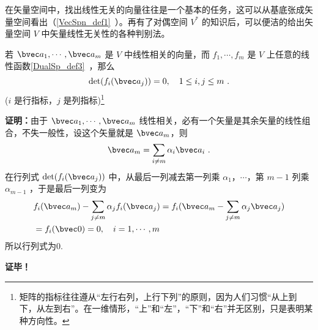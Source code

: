 
\begin{issues}
\end{issues}

在矢量空间中，找出线性无关的向量往往是一个基本的任务，这可以从基底张成矢量空间看出（\autoref{VecSpn_def1}~）。再有了对偶空间 $V^*$ 的知识后，可以便洁的给出矢量空间 $V$ 中矢量线性无关性的各种判别法。
\begin{lemma}{}\label{LinInD_lem1}
若 $\bvec a_1,\cdots,\bvec a_m$ 是 $V$ 中线性相关的向量，而 $f_1,\cdots,f_m$ 是 $V$ 上任意的线性函数\autoref{DualSp_def3}~，那么
\begin{equation}
\det(f_i(\bvec a_j))=0,\quad 1\leq i,j\leq m~.
\end{equation}
($i$ 是行指标，$j$ 是列指标)\footnote{矩阵的指标往往遵从“左行右列，上行下列”的原则，因为人们习惯“从上到下，从左到右”。在一维情形，“上”和“左”，“下”和“右”并无区别，只是表明某种方向性。}
\end{lemma}
\textbf{证明：}由于 $\bvec a_1,\cdots,\bvec a_m$ 线性相关，必有一个矢量是其余矢量的线性组合，不失一般性，设这个矢量就是 $\bvec a_m$，则
\begin{equation}
\bvec a_m=\sum_{i\neq m}\alpha_i\bvec a_i~.
\end{equation}
在行列式 $\det(f_i(\bvec a_j))$ 中，从最后一列减去第一列乘 $\alpha_1$，$\cdots$，第 $m-1$ 列乘 $\alpha_{m-1}$ ，于是最后一列变为
\begin{equation}
\begin{aligned}
&f_i(\bvec a_m)-\sum_{j\neq m}\alpha_j f_i(\bvec a_j)=f_i(\bvec a_m-\sum_{j\neq m}\alpha_{j}\bvec a_j)\\
&=f_i(\bvec 0)=0,\quad i=1,\cdots ,m
\end{aligned}
\end{equation}
所以行列式为0.

\textbf{证毕！}


